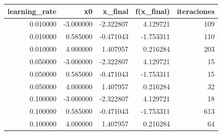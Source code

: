 \begin{tabular}{rrrrr}
\toprule
learning_rate & x0 & x_final & f(x_final) & iteraciones \\
\midrule
0.010000 & -3.000000 & -2.322807 & 4.129721 & 109 \\
0.010000 & 0.585000 & -0.471043 & -1.753311 & 110 \\
0.010000 & 4.000000 & 1.407957 & 0.216284 & 203 \\
0.050000 & -3.000000 & -2.322807 & 4.129721 & 15 \\
0.050000 & 0.585000 & -0.471043 & -1.753311 & 15 \\
0.050000 & 4.000000 & 1.407957 & 0.216284 & 32 \\
0.100000 & -3.000000 & -2.322807 & 4.129721 & 18 \\
0.100000 & 0.585000 & -0.471043 & -1.753311 & 613 \\
0.100000 & 4.000000 & 1.407957 & 0.216284 & 64 \\
\bottomrule
\end{tabular}
